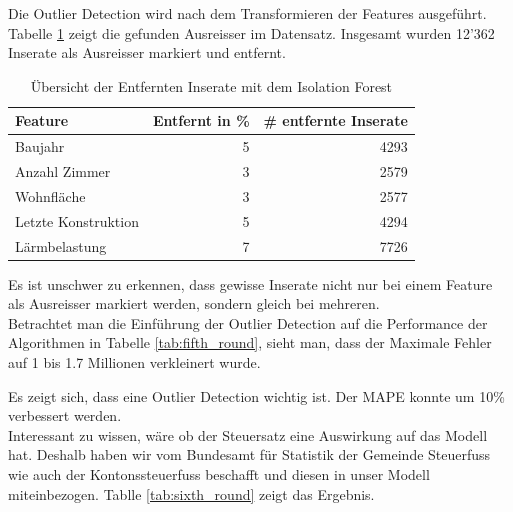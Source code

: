 %
Die Outlier Detection wird nach dem Transformieren der Features ausgeführt. Tabelle \ref{tab:iso_forest} zeigt die gefunden Ausreisser im Datensatz. Insgesamt wurden 12'362 Inserate als Ausreisser markiert und entfernt.\\[2ex]
%
\begin{table}[ht]
\centering
{}
\begin{tabular}{@{}lrr@{}}
\toprule
Feature & Entfernt in \% & \# entfernte Inserate\\
\midrule
Baujahr & 5 & 4293\\
Anzahl Zimmer & 3 & 2579\\
Wohnfläche & 3 & 2577\\
Letzte Konstruktion & 5 & 4294\\
Lärmbelastung & 7 & 7726\\
\bottomrule
\end{tabular}
\caption{Übersicht der Entfernten Inserate mit dem Isolation Forest}
\label{tab:iso_forest}
\end{table}
%
Es ist unschwer zu erkennen, dass gewisse Inserate nicht nur bei einem Feature als Ausreisser markiert werden, sondern gleich bei mehreren.\\[2ex]
%
Betrachtet man die Einführung der Outlier Detection auf die Performance der Algorithmen in Tabelle \ref{tab:fifth_round}, sieht man, dass der Maximale Fehler auf 1 bis 1.7 Millionen verkleinert wurde.\\[2ex]
%
\begin{table}[ht]
\centering
{}
\caption{Ergebnisse mit Einbezug einer Outlier Detection}
\label{tab:fifth_round}
\end{table}
%
Es zeigt sich, dass eine Outlier Detection wichtig ist. Der MAPE konnte um 10\% verbessert werden.\\[2ex] 
%
Interessant zu wissen, wäre ob der Steuersatz eine Auswirkung auf das Modell hat. Deshalb haben wir vom Bundesamt für Statistik der Gemeinde Steuerfuss wie auch der Kontonssteuerfuss beschafft und diesen in unser Modell miteinbezogen. Tablle \ref{tab:sixth_round} zeigt das Ergebnis.\\[2ex]
